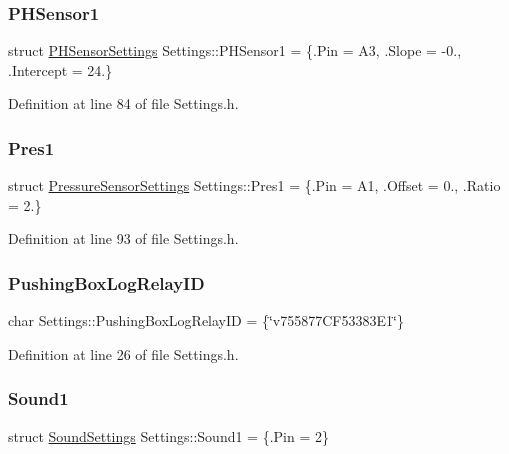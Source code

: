 \subsubsection{\texorpdfstring{P\+H\+Sensor1}{PHSensor1}}
{\footnotesize\ttfamily struct \hyperlink{struct_settings_1_1_p_h_sensor_settings}{P\+H\+Sensor\+Settings} Settings\+::\+P\+H\+Sensor1 = \{.Pin = A3, .Slope = -\/0., .Intercept = 24.\}}



Definition at line 84 of file Settings.\+h.

\mbox{\label{struct_settings_a633ec2a87581e7bbd5e124b5cfb3fb80}} 
\subsubsection{\texorpdfstring{Pres1}{Pres1}}
{\footnotesize\ttfamily struct \hyperlink{struct_settings_1_1_pressure_sensor_settings}{Pressure\+Sensor\+Settings} Settings\+::\+Pres1 = \{.Pin = A1, .Offset = 0., .Ratio = 2.\}}



Definition at line 93 of file Settings.\+h.

\mbox{\label{struct_settings_af2e86b73866c5031676f9ee1db9101b0}} 
\subsubsection{\texorpdfstring{Pushing\+Box\+Log\+Relay\+ID}{PushingBoxLogRelayID}}
{\footnotesize\ttfamily char Settings\+::\+Pushing\+Box\+Log\+Relay\+ID = \{\char`\"{}v755877\+C\+F53383\+E1\char`\"{}\}}



Definition at line 26 of file Settings.\+h.

\mbox{\label{struct_settings_a8a8e8440de1c81b9a0db84cc701c47e8}} 
\subsubsection{\texorpdfstring{Sound1}{Sound1}}
{\footnotesize\ttfamily struct \hyperlink{struct_settings_1_1_sound_settings}{Sound\+Settings} Settings\+::\+Sound1 = \{.Pin = 2\}}



